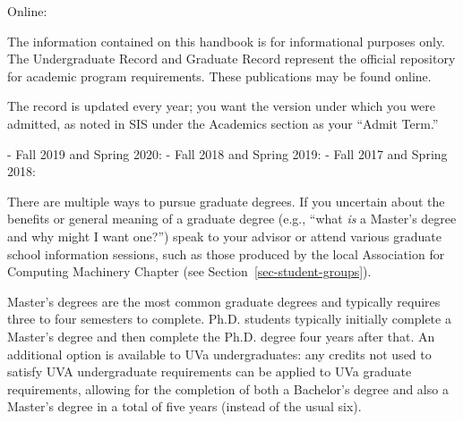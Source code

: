 \noindent Online: \csmsURL


The information contained on this handbook is for informational
purposes only. The Undergraduate Record and Graduate Record represent
the official repository for academic program requirements. These
publications may be found online.

The record is updated every year; you want the version under which you were admitted,
as noted in SIS under the Academics section as your ``Admit Term.''

- Fall 2019 and Spring 2020: 
- Fall 2018 and Spring 2019: 
- Fall 2017 and Spring 2018: 







There are multiple ways to pursue graduate degrees. If you uncertain about
the benefits or general meaning of a graduate degree (e.g., ``what
\emph{is} a Master's degree and why might I want one?'') speak to your
advisor or attend various graduate school information sessions, such as
those produced by the local Association for Computing Machinery Chapter
(see Section~\ref{sec-student-groups}). 

Master's degrees are the most common graduate degrees and typically
requires three to four semesters to complete. Ph.D. students typically
initially complete a Master's degree and then complete the Ph.D. degree
four years after that. An additional option is available to UVa
undergraduates: any credits not used to satisfy UVA undergraduate
requirements can be applied to UVa graduate requirements, allowing for the
completion of both a Bachelor's degree and also a Master's degree in a
total of five years (instead of the usual six). 

